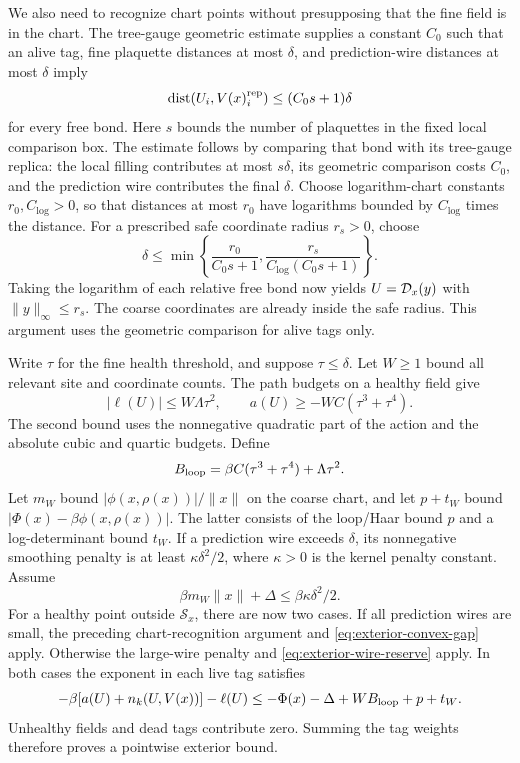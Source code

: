 We also need to recognize chart points without presupposing that
the fine field is in the chart. The tree-gauge geometric estimate
supplies a constant $C_0$ such that an alive tag, fine plaquette
distances at most $\delta$, and prediction-wire distances at most
$\delta$ imply
\[
       \operatorname{dist}(U_i,V(x)^{\rm rep}_i)
                       \le (C_0s+1)\delta
\]
for every free bond. Here $s$ bounds the number of plaquettes in
the fixed local comparison box. The estimate follows by comparing
that bond with its tree-gauge replica: the local filling contributes
at most $s\delta$, its geometric comparison costs $C_0$, and the
prediction wire contributes the final $\delta$.
Choose logarithm-chart constants $r_0,C_{\log}>0$, so that distances
at most $r_0$ have logarithms bounded by $C_{\log}$ times the
distance. For a prescribed safe coordinate radius $r_s>0$, choose
\[
 \delta\le\min\left\{\frac{r_0}{C_0s+1},
                    \frac{r_s}{C_{\log}(C_0s+1)}\right\}.
\]
Taking the logarithm of each relative free bond now yields
$U={\cal D}_x(y)$ with $\|y\|_\infty\le r_s$. The coarse
coordinates are already inside the safe radius. This argument uses
the geometric comparison for alive tags only.

Write $\tau$ for the fine health threshold, and suppose
$\tau\le\delta$. Let $W\ge1$ bound all relevant site and coordinate
counts. The path budgets on a healthy field give
\[
 |\ell(U)|\le W\Lambda\tau^2,\qquad
 a(U)\ge-WC(\tau^3+\tau^4).
\]
The second bound uses the nonnegative quadratic part of the action
and the absolute cubic and quartic budgets. Define
\[
 B_{\rm loop}=\beta C(\tau^3+\tau^4)+\Lambda\tau^2.
\]
Let $m_W$ bound $|\phi(x,\rho(x))|/\|x\|$ on the coarse chart,
and let $p+t_W$ bound
$|\Phi(x)-\beta\phi(x,\rho(x))|$. The latter consists of the
loop/Haar bound $p$ and a log-determinant bound $t_W$.
If a prediction wire exceeds $\delta$, its nonnegative smoothing
penalty is at least $\kappa\delta^2/2$, where $\kappa>0$ is the
kernel penalty constant. Assume
\begin{equation}\label{eq:exterior-wire-reserve}
            \beta m_W\|x\|+\Delta
                              \le\beta\kappa\delta^2/2.
\end{equation}
For a healthy point outside $\mathcal S_x$, there are now two cases.
If all prediction wires are small, the preceding chart-recognition
argument and \eqref{eq:exterior-convex-gap} apply. Otherwise the
large-wire penalty and \eqref{eq:exterior-wire-reserve} apply.
In both cases the exponent in each live tag satisfies
\[
 -\beta[a(U)+n_k(U,V(x))]-\ell(U)
           \le-\Phi(x)-\Delta+WB_{\rm loop}+p+t_W.
\]
Unhealthy fields and dead tags contribute zero. Summing the tag
weights therefore proves a pointwise exterior bound.

